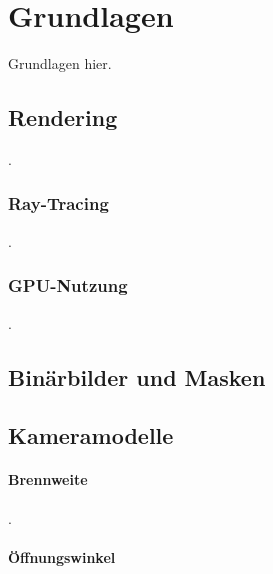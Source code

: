 
\section{Grundlagen}
\label{sec:daten:grundlagen}

Grundlagen hier.

\subsection{Rendering}
\label{sec:rendering}

.

\subsubsection{Ray-Tracing}
\label{sec:ray_tracing}

.

\subsubsection{GPU-Nutzung}
\label{sec:gpu_nutzung}

.


\subsection{Binärbilder und Masken}
\label{sec:masken}


\subsection{Kameramodelle}
\label{sec:kameras}

\paragraph{Brennweite}

.

\paragraph{Öffnungswinkel}

